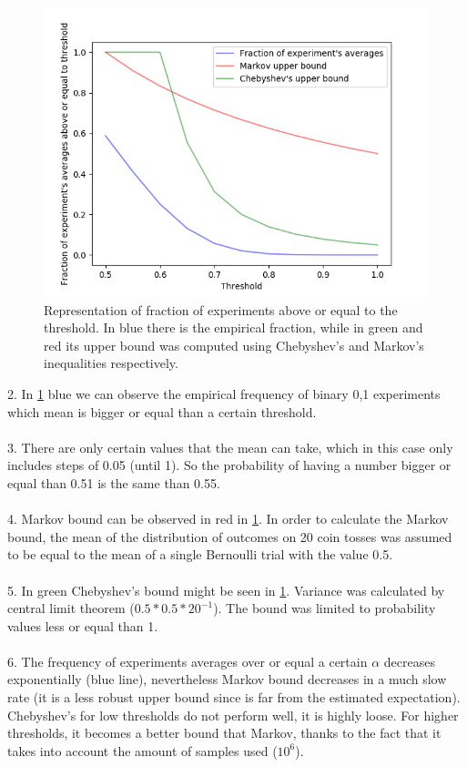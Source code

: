 \documentclass[a4paper]{article}
\begin{document}
\begin{figure}[H]
  \centering
  \includegraphics[width=\textwidth]{code/markov_chebychev.png}
  \caption{Representation of fraction of experiments above or equal to the threshold. In blue there is the empirical fraction, while in green and red its upper bound was computed using Chebyshev's and Markov's inequalities respectively. }
  \label{fig:plot_bounds}
\end{figure}
2. In \ref{fig:plot_bounds} blue we can observe the empirical frequency of binary 0,1 experiments which mean is bigger or equal than a certain threshold.  \\\\
3. There are only certain values that the mean can take, which in this case only includes steps of 0.05 (until 1).
	So the probability of having a number bigger or equal than 0.51 is the same than 0.55.\\\\
4. Markov bound can be observed in red in  \ref{fig:plot_bounds}. In order to calculate the Markov bound, the mean of the distribution of outcomes on 20 coin tosses was assumed to be equal to the mean of a single Bernoulli trial with the value 0.5. \\\\
5. In green Chebyshev's bound might be seen in \ref{fig:plot_bounds}. Variance was calculated by central limit theorem ($0.5*0.5*20^{-1}$). The bound was limited to probability values less or equal than 1.\\\\
6. The frequency of experiments averages over or equal a certain $\alpha$ decreases exponentially (blue line), nevertheless Markov bound decreases in a much slow rate (it is a less robust upper bound since is far from the estimated expectation). Chebyshev's for low thresholds do not perform well, it is highly loose. For higher thresholds, it becomes a better bound that Markov, thanks to the fact that it takes into account the amount of samples used ($10^{6}$).\\\\
\end{document}
